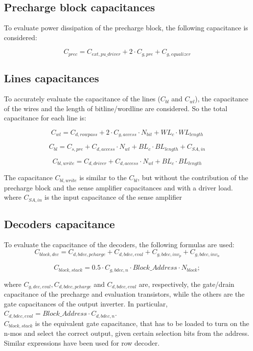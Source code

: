 \subsection{Precharge block capacitances}

To evaluate power dissipation of the precharge block, the following capacitance is considered: 

\[
C_{prec}=C_{ext,pu\_driver}+2 \cdot C_{g,pre}+C_{g,equalizer}
\]

\subsection{Lines capacitances}
\label{subsec:capacitance}

To accurately evaluate the capacitance of the lines ($C_{bl}$ and $C_{wl}$), the capacitance of the wires and the length of bitline/wordline are considered. So the total capacitance for each line is:

\[
C_{wl} = C_{d,rowpass} + 2 \cdot C_{g,access} \cdot N_{bit} + WL_c \cdot WL_{length}
\]

\[
C_{bl}= C_{s,pre} + C_{d,access} \cdot N_{wl} + BL_c \cdot BL_{length} +C_{SA,in}
\]

\[
C_{bl,write}= C_{d,driver} + C_{d,access} \cdot N_{wl} + BL_c \cdot BL_{length}
\]

The capacitance $C_{bl,write}$ is similar to the $C_{bl}$, but without the contribution of the precharge block and the sense amplifier capacitances and with a driver load.\\

where $C_{SA,in}$ is the input capacitance of the sense amplifier
\subsection{Decoders capacitance}
\label{subsec:dec_capacitance}
To evaluate the capacitance of the decoders, the following formulas are used:
\[
C_{block,dec}=C_{d,bdec,pcharge}+C_{d,bdec,eval}+C_{g,bdec,inv_{p}}+C_{g,bdec,inv_{n}}
\]

\[
C_{block,stack}=0.5 \cdot C_{g,bdec,n} \cdot Block\_Address \cdot N_{block};
\]

where $C_{g,dec,eval}, C_{d,bdec,pcharge}$ and $C_{d,bdec,eval}$ are, respectively, the gate/drain capacitance of the precharge and evaluation transistors, while the others are the gate capacitances of the output inverter.
In particular, $C_{d,bdec,eval} = Block\_Address \cdot C_{d,bdec,n}$.\\
$C_{block,stack}$ is the equivalent gate capacitance, that has to be loaded to turn on the n-mos and select the correct output, given certain selection bits from the address.\\
Similar expressions have been used for row decoder.
